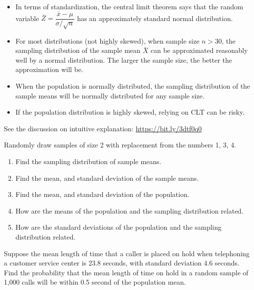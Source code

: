 \begin{remark}
  \begin{itemize}
    \item 
  In terms of standardization, the central limit
    theorem says that the random variable
    \(\bar{Z}=\dfrac{\bar{x}-\mu}{\sigma/\sqrt{n}}\) has an approximately
    standard normal distribution.
  \item
    For most distributions (not highly skewed), when sample size \(n>30\),
    the sampling distribution of the sample mean \(\bar{X}\) can be
    approximated reasonably well by a normal distribution. The larger the
    sample size, the better the approximation will be.
  \item
    When the population is normally distributed, the sampling distribution of the sample means will be normally distributed for any sample size.
  \item
    If the population distribution is highly skewed, relying on CLT can be
    risky.
  \end{itemize}
\end{remark} 

See the discussion on intuitive explanation:
\url{https://bit.ly/3dtf0q0}

\begin{example}

Randomly draw samples of size 2 with replacement from the numbers 1, 3,
4.

\begin{enumerate}
\item
  Find the sampling distribution of sample means.
\item
  Find the mean, and standard deviation of the sample means.
\item
  Find the mean, and standard deviation of the population.
\item
  How are the means of the population and the sampling distribution
  related.
\item
  How are the standard deviations of the population and the sampling
  distribution related.
\end{enumerate}

\end{example}

\begin{example}

Suppose the mean length of time that a caller is placed on hold when
telephoning a customer service center is 23.8 seconds, with standard
deviation 4.6 seconds. Find the probability that the mean length of time
on hold in a random sample of 1,000 calls will be within 0.5 second of
the population mean.

\end{example}

